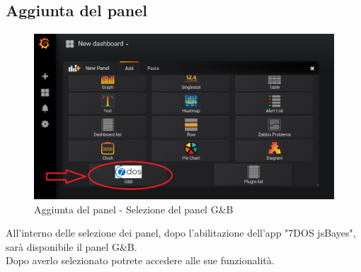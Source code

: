 \subsection{Aggiunta del panel}
\begin{figure} [H]
	\centering
	\includegraphics[scale=0.8]{Img/aggiuntapanel} 
	\caption{Aggiunta del panel - Selezione del panel G\&B} \label{} 
\end{figure} 
All'interno delle selezione dei panel, dopo l'abilitazione dell'app "7DOS jsBayes", sarà disponibile il panel G\&B.\\
Dopo averlo selezionato potrete accedere alle sue funzionalità.
\pagebreak